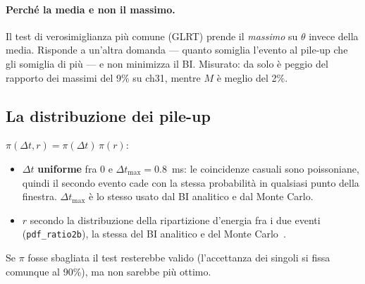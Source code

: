 \documentclass[11pt,a4paper]{article}
\newcommand{\dt}{\Delta t}
\begin{document}
\paragraph{Perché la media e non il massimo.} Il test di verosimiglianza più comune (GLRT) prende il
\emph{massimo} su $\theta$ invece della media. Risponde a un'altra domanda --- quanto somiglia
l'evento al pile-up che gli somiglia di più --- e non minimizza il BI. Misurato: da solo è peggio
del rapporto dei massimi del 9\% su ch31, mentre $M$ è meglio del 2\%.

\subsection{La distribuzione dei pile-up}
\label{sec:prior}
$\pi(\dt, r) = \pi(\dt)\,\pi(r)$:
\begin{itemize}
  \item $\dt$ \textbf{uniforme} fra 0 e $\dt_\text{max} = 0.8$~ms: le coincidenze casuali sono
    poissoniane, quindi il secondo evento cade con la stessa probabilità in qualsiasi punto della
    finestra. $\dt_\text{max}$ è lo stesso usato dal BI analitico e dal Monte Carlo.
  \item $r$ secondo la distribuzione della ripartizione d'energia fra i due eventi
    (\texttt{pdf\_ratio2b}), la stessa del BI analitico e del Monte Carlo~\cite{Chernyak2012}.
\end{itemize}
Se $\pi$ fosse sbagliata il test resterebbe valido (l'accettanza dei singoli si fissa comunque al
90\%), ma non sarebbe più ottimo.
\end{document}
